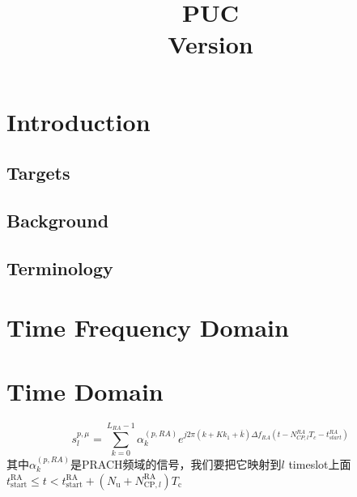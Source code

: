 \documentclass{article}
\title{
	\Huge \textbf{PUC} \\[1em]
	\normalsize Version \version 
}
\author{}
\date{}
\begin{document}
\maketitle

\tableofcontents
\newpage

\section{Introduction}
\subsection{Targets}


\subsection{Background}
\subsection{Terminology}



\section{Time Frequency Domain}

\section{Time Domain}
\begin{equation}
s_l^{p,\mu} = \sum_{k=0}^{L_{RA}-1}\alpha^{(p,RA)}_k e^{j2\pi(k+Kk_1+\bar{k})\Delta f_{RA}(t-N_{CP,l}^{RA}T_c - t^{RA}_{start})}
\end{equation}
其中$\alpha^{(p,RA)}_k$是PRACH频域的信号，我们要把它映射到$l$ timeslot上面\\
$t^{\text{RA}}_{\text{start}} \leq t < t^{\text{RA}}_{\text{start}} + (N_{\text{u}} + N_{\text{CP}, l}^{\text{RA}})T_\text{c}$
\end{document}
